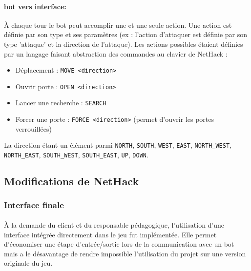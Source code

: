 \documentclass[a4paper,12pt]{article}
\begin{document}
\paragraph{bot vers interface:} À chaque tour le bot peut accomplir une et une
seule action. Une action est définie par son type et ses paramètres (ex :
l'action d'attaquer est définie par son type 'attaque' et la direction de
l'attaque). Les actions possibles étaient définies par un langage faisant
abstraction des commandes au clavier de NetHack :
\begin{itemize}
	\item Déplacement : \verb!MOVE <direction>!
	\item Ouvrir porte : \verb!OPEN <direction>!
	\item Lancer une recherche : \verb!SEARCH!
	\item Forcer une porte : \verb!FORCE <direction>! (permet d'ouvrir les portes verrouillées)
\end{itemize}
\noindent La direction étant un élément parmi \verb!NORTH!, \verb!SOUTH!,
\verb!WEST!, \verb!EAST!, \verb!NORTH_WEST!, \verb!NORTH_EAST!,
\verb!SOUTH_WEST!, \verb!SOUTH_EAST!, \verb!UP!, \verb!DOWN!.


\subsection{Modifications de NetHack}

\subsubsection{Interface finale}

\paragraph{}À la demande du client et du responsable pédagogique,
l'utilisation d'une interface intégrée directement dans le jeu fut
implémentée. Elle permet d'économiser une étape d'entrée/sortie lors de la
communication avec un bot mais a le désavantage de rendre impossible
l'utilisation du projet sur une version originale du jeu.
\end{document}
